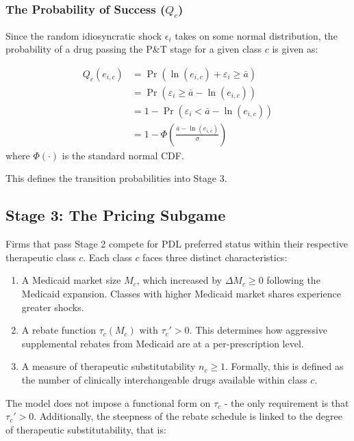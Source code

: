 \documentclass[12pt]{article}
\begin{document}
\subsubsection{The Probability of Success \texorpdfstring{($Q_c$)}{(Qc)}}
Since the random idiosyncratic shock $\epsilon_i$ takes on some normal distribution, the probability of a drug passing the P\&T stage for a given class $c$ is given as:

\begin{align}
    Q_c(e_{i,c}) &= \Pr \left(\ln(e_{i,c}) + \varepsilon_i \geq \bar{a} \right) \\
           &= \Pr \left( \varepsilon_i \geq \bar{a} - \ln(e_{i,c}) \right) \\
           &= 1 - \Pr  \left(\varepsilon_i < \bar{a} - \ln(e_{i,c}) \right) \\
           &= 1 - \Phi\left(\frac{\bar{a} - \ln(e_{i,c})}{\sigma}\right)
\end{align}
where $\Phi(\cdot)$ is the standard normal CDF. \vspace{1em}

This defines the transition probabilities into Stage 3.

\subsection{Stage 3: The Pricing Subgame}
Firms that pass Stage 2 compete for PDL preferred status within their respective therapeutic class $c$. Each class $c$ faces three distinct characteristics:

\begin{enumerate}[label=(\roman*)]
    \item A Medicaid market size $M_c$, which increased by $\Delta M_c \geq 0$ following the Medicaid expansion. Classes with higher Medicaid market shares experience greater shocks.
    
    \item A rebate function $\tau_c(M_c)$ with $\tau_c' > 0$. This determines how aggressive supplemental rebates from Medicaid are at a per-prescription level.
    
    \item A measure of therapeutic substitutability $n_c \geq 1$. Formally, this is defined as the number of clinically interchangeable drugs available within class $c$.
\end{enumerate}

The model does not impose a functional form on $\tau_c$ - the only requirement is that $\tau_c' > 0$. Additionally, the steepness of the rebate schedule is linked to the degree of therapeutic substitutability, that is:
\end{document}
